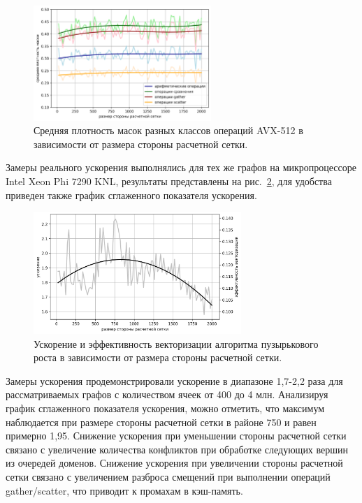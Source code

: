 \begin{figure}[ht]
\centering
\includegraphics[width=0.6\textwidth]{pics/text_4_vec_integer/chart_statistics_rus.png}
\singlespacing
{}\caption{Средняя плотность масок разных классов операций AVX-512\label{abbr:avx8} в зависимости от размера стороны расчетной сетки.}
\label{fig:text_4_vec_integer_stat}
\end{figure}

Замеры реального ускорения выполнялись для тех же графов на микропроцессоре Intel Xeon Phi 7290 KNL\label{abbr:knl15}, результаты представлены на рис.~\ref{fig:text_4_vec_integer_sp}, для удобства приведен также график сглаженного показателя ускорения.

\begin{figure}[ht]
\centering
\includegraphics[width=0.7\textwidth]{pics/text_4_vec_integer/chart_speedup_rus.png}
\singlespacing
{}\caption{Ускорение и эффективность векторизации\label{term:vec_eff7} алгоритма пузырькового роста в зависимости от размера стороны расчетной сетки.}
\label{fig:text_4_vec_integer_sp}
\end{figure}

Замеры ускорения продемонстрировали ускорение в диапазоне 1,7-2,2 раза для рассматриваемых графов с количеством ячеек от 400 до 4 млн.
Анализируя график сглаженного показателя ускорения, можно отметить, что максимум наблюдается при размере стороны расчетной сетки в районе 750 и равен примерно 1,95.
Снижение ускорения при уменьшении стороны расчетной сетки связано с увеличение количества конфликтов при обработке следующих вершин из очередей доменов.
Снижение ускорения при увеличении стороны расчетной сетки связано с увеличением разброса смещений при выполнении операций gather/scatter, что приводит к промахам в кэш-память.

